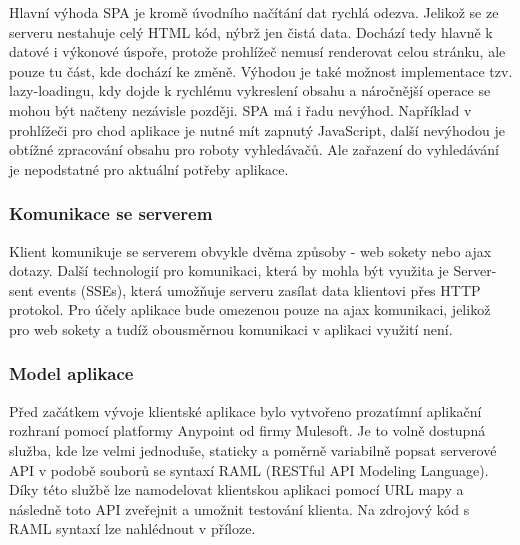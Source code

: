 \documentclass[a4paper,11pt,titlepage,fleqn]{article}
\begin{document}
            Hlavní výhoda SPA je kromě úvodního načítání dat rychlá odezva. Jelikož se ze serveru nestahuje celý HTML kód, nýbrž jen čistá data. Dochází tedy hlavně k datové i výkonové úspoře, protože prohlížeč nemusí renderovat celou stránku, ale pouze tu část, kde dochází ke změně. Výhodou je také možnost implementace tzv. lazy-loadingu, kdy dojde k rychlému vykreslení obsahu a náročnější operace se mohou být načteny nezávisle později. SPA má i řadu nevýhod. Například v prohlížeči pro chod aplikace je nutné mít zapnutý JavaScript, další nevýhodou je obtížné zpracování obsahu pro roboty vyhledávačů. Ale zařazení do vyhledávání je nepodstatné pro aktuální potřeby aplikace.

        \subsubsection{Komunikace se serverem}
            Klient komunikuje se serverem obvykle dvěma způsoby - web sokety nebo \gls{ajax} dotazy. Další technologií pro komunikaci, která by mohla být využita je Server-sent events (SSEs), která umožňuje serveru zasílat data klientovi přes HTTP protokol. Pro účely aplikace bude omezenou pouze na \gls{ajax} komunikaci, jelikož pro web sokety a tudíž obousměrnou komunikaci v aplikaci využití není.


        \subsubsection{Model aplikace}
            Před začátkem vývoje klientské aplikace bylo vytvořeno prozatímní aplikační rozhraní pomocí platformy Anypoint od firmy Mulesoft. Je to volně dostupná služba, kde lze velmi jednoduše, staticky a poměrně variabilně popsat serverové API v podobě souborů se syntaxí RAML (RESTful API Modeling Language). Díky této službě lze namodelovat klientskou aplikaci pomocí URL mapy a následně toto API zveřejnit a umožnit testování klienta. Na zdrojový kód s RAML syntaxí lze nahlédnout v příloze. 
\end{document}
